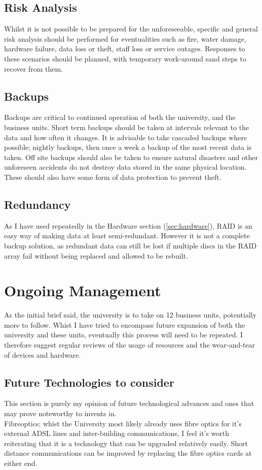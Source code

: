 \documentclass[10pt]{article}
\begin{document}
        \subsection{Risk Analysis}
            Whilst it is not possible to be prepared for the unforeseeable, specific and general risk analysis should be performed for eventualities such as fire, water damage, hardware failure, data loss or theft, staff loss or service outages. Responses to these scenarios should be planned, with temporary work-around sand steps to recover from them. 

        \subsection{Backups}
            Backups are critical to continued operation of both the university, and the business units. Short term backups should be taken at intervals relevant to the data and how often it changes. It is advisable to take cascaded backups where possible; nightly backups, then once a week a backup of the most recent data is taken.
            Off site backups should also be taken to ensure natural disasters and other unforeseen accidents do not destroy data stored in the same physical location. These should also have some form of data protection to prevent theft.

        \subsection{Redundancy}
            As I have used repeatedly in the Hardware section (\ref{sec:hardware}), RAID is an easy way of making data at least semi-redundant. However it is not a complete backup solution, as redundant data can still be lost if multiple discs in the RAID array fail without being replaced and allowed to be rebuilt. 


    \section{Ongoing Management}
        As the initial brief said, the university is to take on 12 business units, potentially more to follow. Whist I have tried to encompass future expansion of both the university and these units, eventually this process will need to be repeated. I therefore suggest regular reviews of the usage of resources and the wear-and-tear of devices and hardware. 

        \subsection{Future Technologies to consider}
            This section is purely my opinion of future technological advances and ones that may prove noteworthy to invents in.
            \\
            Fibreoptics; whist the University most likely already uses fibre optics for it's external ADSL lines and inter-building communications, I feel it's worth reiterating that it is a technology that can be upgraded relatively easily. Short distance communications can be improved by replacing the fibre optics cards at either end. 
\end{document}
